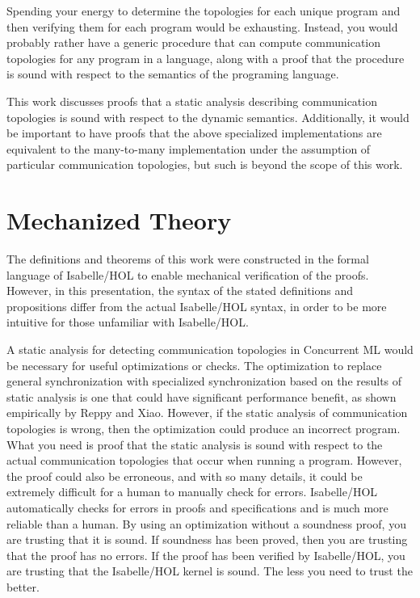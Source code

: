 \documentclass[letterpaper, 11pt]{report}
\begin{document}
Spending your energy to determine the topologies for each unique program and then verifying
them for each program would be exhausting. Instead, you would probably rather have a generic
procedure that can compute communication topologies for any program in a language, along with
a proof that the procedure is sound with respect to the semantics of the programing language.

This work discusses proofs that a static analysis describing communication topologies is
sound with respect to the dynamic semantics.
Additionally, it would be important to have proofs that the above specialized
implementations are equivalent to the many-to-many implementation under the assumption of
particular communication topologies, but such is beyond the scope of this work.

\chapter{Mechanized Theory}

The definitions and theorems of this work were constructed in the formal
language of Isabelle/HOL to enable mechanical verification of the proofs.
However, in this presentation, the syntax of the stated definitions and propositions differ from
the actual Isabelle/HOL syntax, in order to be more intuitive for those unfamiliar with Isabelle/HOL.

A static analysis for detecting communication topologies in Concurrent ML would be necessary for useful
optimizations or checks. The optimization to replace general synchronization with specialized synchronization
based on the results of static analysis is one that could have significant performance benefit, as shown
empirically by Reppy and Xiao. However, if the static analysis of communication topologies is wrong, then
the optimization could produce an incorrect program. What you need is proof that the static analysis is sound
with respect to the actual communication topologies that occur when running a program. However, the proof could also be
erroneous, and with so many details, it could be extremely difficult for a human to manually check for errors.
Isabelle/HOL automatically checks for errors in proofs and specifications and is much more reliable than a
human. By using an optimization without a soundness proof, you are trusting that it is sound. If soundness has
been proved, then you are trusting that the proof has no errors. If the proof has been verified by Isabelle/HOL, 
you are trusting that the Isabelle/HOL kernel is sound. The less you need to trust the better.
\end{document}
